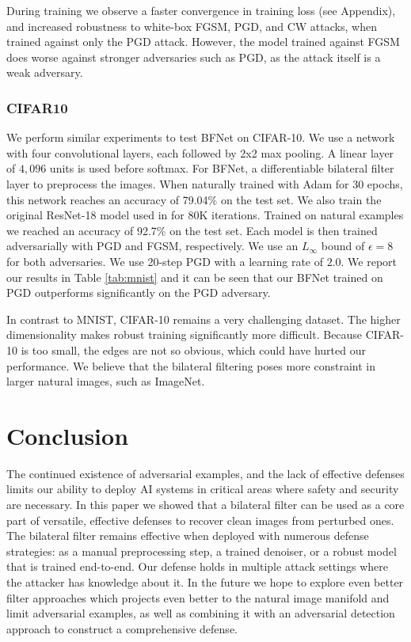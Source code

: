 \documentclass{article} %
\begin{document}
During training we observe a faster convergence in training loss (see Appendix), and increased robustness to white-box FGSM, PGD, and CW attacks, when trained against only the PGD attack. However, the model trained against FGSM does worse against stronger adversaries such as PGD, as the attack itself is a weak adversary. 
\subsubsection{CIFAR10}
We perform similar experiments to test BFNet on CIFAR-10. We use a network with four convolutional layers, each followed by 2x2 max pooling. A linear layer of $4,096$ units is used before softmax. For BFNet, a differentiable bilateral filter layer to preprocess the images. When naturally trained with Adam for 30 epochs, this network reaches an accuracy of 79.04\% on the test set. We also train the original ResNet-18 model used in \citep{madry2017towards} for 80K iterations. Trained on natural examples we reached an accuracy of 92.7\% on the test set. Each model is then trained adversarially with PGD and FGSM, respectively. We use an $L_\infty$ bound of $\epsilon = 8$ for both adversaries. We use 20-step PGD with a learning rate of $2.0$. We report our results in Table \ref{tab:mnist} and it can be seen that our BFNet trained on PGD outperforms \citep{madry2017towards} significantly on the PGD adversary.

In contrast to MNIST, CIFAR-10 remains a very challenging dataset. The higher dimensionality makes robust training significantly more difficult. Because CIFAR-10 is too small, the edges are not so obvious, which could have hurted our performance. We believe that the bilateral filtering poses more constraint in larger natural images, such as ImageNet.


\section*{Conclusion}
The continued existence of adversarial examples, and the lack of effective defenses limits our ability to deploy AI systems in critical areas where safety and security are necessary. In this paper we showed that a bilateral filter can be used as a core part of versatile, effective defenses to recover clean images from perturbed ones. The bilateral filter remains effective when deployed with numerous defense strategies: as a manual preprocessing step, a trained denoiser, or a robust model that is trained end-to-end. Our defense holds in multiple attack settings where the attacker has knowledge about it. In the future we hope to explore even better filter approaches which projects even better to the natural image manifold and limit adversarial examples, as well as combining it with an adversarial detection approach to construct a comprehensive defense.
\end{document}
